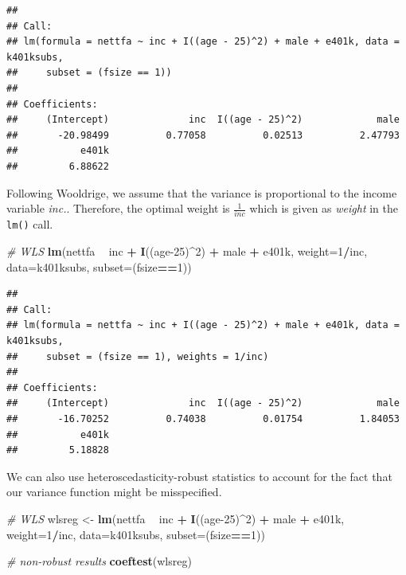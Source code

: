 \documentclass[]{book}
\newenvironment{Shaded}{\begin{snugshade}}{\end{snugshade}}
\newcommand{\CommentTok}[1]{\textcolor[rgb]{0.56,0.35,0.01}{\textit{#1}}}
\newcommand{\DataTypeTok}[1]{\textcolor[rgb]{0.13,0.29,0.53}{#1}}
\newcommand{\DecValTok}[1]{\textcolor[rgb]{0.00,0.00,0.81}{#1}}
\newcommand{\KeywordTok}[1]{\textcolor[rgb]{0.13,0.29,0.53}{\textbf{#1}}}
\newcommand{\NormalTok}[1]{#1}
\newcommand{\OperatorTok}[1]{\textcolor[rgb]{0.81,0.36,0.00}{\textbf{#1}}}
\newcommand{\StringTok}[1]{\textcolor[rgb]{0.31,0.60,0.02}{#1}}
\begin{document}
\begin{verbatim}
## 
## Call:
## lm(formula = nettfa ~ inc + I((age - 25)^2) + male + e401k, data = k401ksubs, 
##     subset = (fsize == 1))
## 
## Coefficients:
##     (Intercept)              inc  I((age - 25)^2)             male  
##       -20.98499          0.77058          0.02513          2.47793  
##           e401k  
##         6.88622
\end{verbatim}

Following Wooldrige, we assume that the variance is proportional to the
income variable \emph{inc.}. Therefore, the optimal weight is
\(\frac{1}{inc}\) which is given as \emph{weight} in the \texttt{lm()}
call.

\begin{Shaded}
\begin{Highlighting}[]
\CommentTok{# WLS}
\KeywordTok{lm}\NormalTok{(nettfa }\OperatorTok{~}\StringTok{ }\NormalTok{inc }\OperatorTok{+}\StringTok{ }\KeywordTok{I}\NormalTok{((age}\DecValTok{-25}\NormalTok{)}\OperatorTok{^}\DecValTok{2}\NormalTok{) }\OperatorTok{+}\StringTok{ }\NormalTok{male }\OperatorTok{+}\StringTok{ }\NormalTok{e401k, }\DataTypeTok{weight=}\DecValTok{1}\OperatorTok{/}\NormalTok{inc, }
   \DataTypeTok{data=}\NormalTok{k401ksubs, }\DataTypeTok{subset=}\NormalTok{(fsize}\OperatorTok{==}\DecValTok{1}\NormalTok{))}
\end{Highlighting}
\end{Shaded}

\begin{verbatim}
## 
## Call:
## lm(formula = nettfa ~ inc + I((age - 25)^2) + male + e401k, data = k401ksubs, 
##     subset = (fsize == 1), weights = 1/inc)
## 
## Coefficients:
##     (Intercept)              inc  I((age - 25)^2)             male  
##       -16.70252          0.74038          0.01754          1.84053  
##           e401k  
##         5.18828
\end{verbatim}

We can also use heteroscedasticity-robust statistics to account for the
fact that our variance function might be misspecified.

\begin{Shaded}
\begin{Highlighting}[]
\CommentTok{# WLS}
\NormalTok{wlsreg <-}\StringTok{ }\KeywordTok{lm}\NormalTok{(nettfa }\OperatorTok{~}\StringTok{ }\NormalTok{inc }\OperatorTok{+}\StringTok{ }\KeywordTok{I}\NormalTok{((age}\DecValTok{-25}\NormalTok{)}\OperatorTok{^}\DecValTok{2}\NormalTok{) }\OperatorTok{+}\StringTok{ }\NormalTok{male }\OperatorTok{+}\StringTok{ }\NormalTok{e401k, }
             \DataTypeTok{weight=}\DecValTok{1}\OperatorTok{/}\NormalTok{inc, }\DataTypeTok{data=}\NormalTok{k401ksubs, }\DataTypeTok{subset=}\NormalTok{(fsize}\OperatorTok{==}\DecValTok{1}\NormalTok{))}

\CommentTok{# non-robust results}
\KeywordTok{coeftest}\NormalTok{(wlsreg)}
\end{Highlighting}
\end{Shaded}
\end{document}
